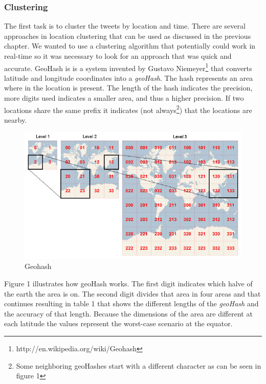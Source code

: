 \documentclass[
10pt, %
a4paper, %
oneside, %
headinclude,footinclude, %
BCOR5mm, %
]{scrartcl}
\begin{document}
\subsubsection{Clustering}
The first task is to cluster the tweets by location and time. There are several approaches in location clustering that can be used as discussed in the previous chapter. We wanted to use a clustering algorithm that potentially could work in real-time so it was necessary to look for an approach that was quick and accurate. GeoHash is is a system invented by Gustavo Niemeyer\footnote{http://en.wikipedia.org/wiki/Geohash} that converts latitude and longitude coordinates into a \textit{geoHash}. The hash represents an area where in the location is present. The length of the hash indicates the precision, more digits used indicates a smaller area, and thus a higher precision. If two locations share the same prefix it indicates (not always\footnote{Some neighboring geoHashes start with a different character as can be seen in figure 1 }) that the locations are nearby. 
\begin{figure}[htbp] %
   \centering
   \includegraphics[width=4.5in]{geohash.jpg} 
   \caption{Geohash}
   \label{fig:geohash}
\end{figure}
\vl
 Figure 1 illustrates how geoHash works. The first digit indicates which halve of the earth the area is on. The second digit divides that area in four areas and that continues resulting in table 1 that shows the different lengths of the \textit{geoHash} and the accuracy of that length. Because the dimensions of the area are different at each latitude the values represent the worst-case scenario at the equator.
\end{document}
